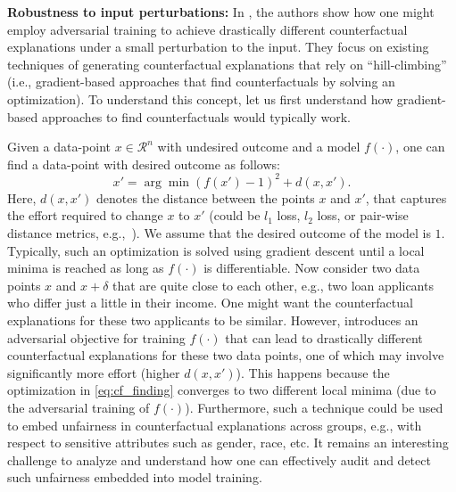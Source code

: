 \documentclass[sigconf]{acmart}
\begin{document}
\textbf{Robustness to input perturbations:} In \cite{slack2021counterfactual}, the authors show how one might employ adversarial training to achieve drastically different counterfactual explanations under a small perturbation to the input. They focus on existing techniques of generating counterfactual explanations that rely on ``hill-climbing'' (i.e., gradient-based approaches that find counterfactuals by solving an optimization). To understand this concept, let us first understand how gradient-based approaches to find counterfactuals would typically work.

Given a data-point $x\in \mathcal{R}^n$ with undesired outcome and a model $f(\cdot)$, one can find a data-point with desired outcome as follows:
\begin{equation}
    x'=\arg \min (f(x')-1)^2 + d(x,x'). \label{eq:cf_finding}
\end{equation}
Here, $d(x,x')$ denotes the distance between the points $x$ and $x'$, that captures the effort required to change $x$ to $x'$ (could be $l_1$ loss, $l_2$ loss, or pair-wise distance metrics, e.g.,~\cite{verma2020counterfactual,upadhyay2021towards}). We assume that the desired outcome of the model is $1$. Typically, such an optimization is solved using gradient descent until a local minima is reached as long as $f(\cdot)$ is differentiable. Now consider two data points $x$ and $x+\delta$ that are quite close to each other, e.g., two loan applicants who differ just a little in their income. One might want the counterfactual explanations for these two applicants to be similar. However, \cite{slack2021counterfactual} introduces an adversarial objective for training $f(\cdot)$ that can lead to drastically different counterfactual explanations for these two data points, one of which may involve significantly more effort (higher $d(x,x')$). This happens because the optimization in \eqref{eq:cf_finding} converges to two different local minima (due to the adversarial training of $f(\cdot)$). Furthermore, such a technique could be used to embed unfairness in counterfactual explanations across groups, e.g., with respect to sensitive attributes such as gender, race, etc. It remains an interesting challenge to analyze and understand how one can effectively audit and detect such unfairness embedded into model training.
\end{document}
